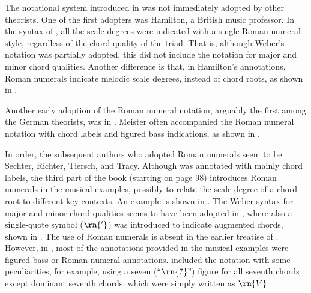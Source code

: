 


The notational system introduced in
\textcite{weber1817versuch} was not immediately adopted by
other theorists. One of the first adopters was Hamilton, a
British music professor. In the syntax of
\textcite{hamilton1840catechism}, all the scale degrees were
indicated with a single Roman numeral style, regardless of
the chord quality of the triad. That is, although Weber's
notation was partially adopted, this did not include the
notation for major and minor chord qualities. Another
difference is that, in Hamilton's annotations, Roman
numerals indicate melodic scale degrees, instead of chord
roots, as shown in
.

Another early adoption of the Roman numeral notation,
arguably the first among the German theorists, was in
\textcite{meister1852vollstandige}. Meister often
accompanied the Roman numeral notation with chord labels and
figured bass indications, as shown in
.


In order, the subsequent authors who adopted Roman numerals
seem to be Sechter, Richter, Tiersch, and Tracy. Although
\textcite{sechter1853grundsatze} was annotated with mainly
chord labels, the third part of the book (starting on page
98) introduces Roman numerals in the musical examples,
possibly to relate the scale degree of a chord root to
different key contexts. An example is shown in
. The Weber
syntax for major and minor chord qualities seems to have
been adopted in \textcite{richter1860lehrbuch}, where also a
single-quote symbol ($\rn{'}$) was introduced to indicate
augmented chords, shown in
. The use of
Roman numerals is absent in the earlier treatise of
\textcite{tiersch1868system}. However,  in
\textcite{tiersch1874elementarbuch}, most of the annotations
provided in the musical examples were figured bass or Roman
numeral annotations. \textcite{tracy1878theory} included the
notation with some peculiarities, for example, using a seven
(``$\rn{7}$'') figure for all seventh chords except dominant
seventh chords, which were simply written as $\rn{V}$.

